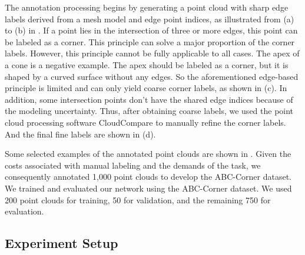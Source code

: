 \documentclass[lettersize,journal]{IEEEtran}
\begin{document}
The annotation processing begins by generating a point cloud with sharp edge labels derived from a mesh model and edge point indices, as illustrated from (a) to (b) in . 
If a point lies in the intersection of three or more edges, this point can be labeled as a corner. This principle can solve a major proportion of the corner labels. However, this principle cannot be fully applicable to all cases. The apex of a cone is a negative example. The apex should be labeled as a corner, but it is shaped by a curved surface without any edges. So the aforementioned edge-based principle is limited and can only yield coarse corner labels, as shown in (c). In addition, some intersection points don't have the shared edge indices because of the modeling uncertainty. 
Thus, after obtaining coarse labels, we used the point cloud processing software CloudCompare to manually refine the corner labels. And the final fine labels are shown in (d). 

Some selected examples of the annotated point clouds are shown in . 
Given the costs associated with manual labeling and the demands of the task, we consequently annotated 1,000 point clouds to develop the ABC-Corner dataset.
We trained and evaluated our network using the ABC-Corner dataset. We used 200 point clouds for training, 50 for validation, and the remaining 750 for evaluation.

\subsection{Experiment Setup}
\label{sec:experiment setup}
\end{document}

